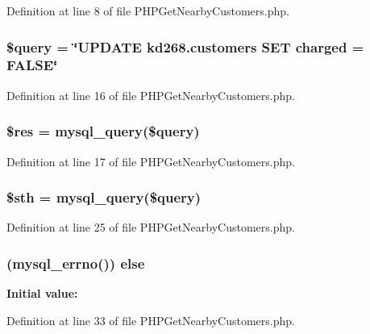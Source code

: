 Definition at line 8 of file P\-H\-P\-Get\-Nearby\-Customers.\-php.

\hypertarget{_p_h_p_get_nearby_customers_8php_af59a5f7cd609e592c41dc3643efd3c98}{
\subsubsection[{\$query}]{\setlength{\rightskip}{0pt plus 5cm}\$query = \char`\"{}U\-P\-D\-A\-T\-E kd268.\-customers S\-E\-T charged = F\-A\-L\-S\-E\char`\"{}}}\label{_p_h_p_get_nearby_customers_8php_af59a5f7cd609e592c41dc3643efd3c98}


Definition at line 16 of file P\-H\-P\-Get\-Nearby\-Customers.\-php.

\hypertarget{_p_h_p_get_nearby_customers_8php_a49a8a4009b02e49717caa88b128affc5}{
\subsubsection[{\$res}]{\setlength{\rightskip}{0pt plus 5cm}\$res = mysql\-\_\-query(\$query)}}\label{_p_h_p_get_nearby_customers_8php_a49a8a4009b02e49717caa88b128affc5}


Definition at line 17 of file P\-H\-P\-Get\-Nearby\-Customers.\-php.

\hypertarget{_p_h_p_get_nearby_customers_8php_afa9126f9664959c02795be300a135f93}{
\subsubsection[{\$sth}]{\setlength{\rightskip}{0pt plus 5cm}\$sth = mysql\-\_\-query(\$query)}}\label{_p_h_p_get_nearby_customers_8php_afa9126f9664959c02795be300a135f93}


Definition at line 25 of file P\-H\-P\-Get\-Nearby\-Customers.\-php.

\hypertarget{_p_h_p_get_nearby_customers_8php_acd5fe7f2086f786c96623b819503b734}{
\subsubsection[{else}]{ (mysql\-\_\-errno()) else}}\label{_p_h_p_get_nearby_customers_8php_acd5fe7f2086f786c96623b819503b734}
{\bfseries Initial value\-:}


Definition at line 33 of file P\-H\-P\-Get\-Nearby\-Customers.\-php.


